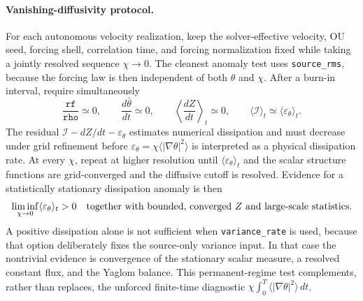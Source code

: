 \documentclass[10pt]{article}
\begin{document}
\paragraph{Vanishing-diffusivity protocol.}
For each autonomous velocity realization, keep the solver-effective velocity,
OU seed, forcing shell, correlation time, and forcing normalization fixed
while taking a jointly resolved sequence $\chi\to0$.  The cleanest anomaly
test uses \texttt{source\_rms}, because the forcing law is then independent of
both $\theta$ and $\chi$.  After a burn-in interval, require simultaneously
\begin{equation}
 \frac{\texttt{rf}}{\texttt{rho}}\simeq0,\qquad
 \frac{d\bar{\theta}}{dt}\simeq0,\qquad
 \left\langle\frac{dZ}{dt}\right\rangle_t\simeq0,\qquad
 \langle\mathcal I\rangle_t\simeq
 \langle\varepsilon_\theta\rangle_t .
\end{equation}
The residual
$\mathcal I-dZ/dt-\varepsilon_\theta$ estimates numerical dissipation and
must decrease under grid refinement before
$\varepsilon_\theta=\chi\langle|\nabla\theta|^2\rangle$ is interpreted as a
physical dissipation rate.
At every $\chi$, repeat at higher resolution until
$\langle\varepsilon_\theta\rangle_t$ and the scalar structure functions are
grid-converged and the diffusive cutoff is resolved.  Evidence for a
statistically stationary dissipation anomaly is then
\begin{equation}
 \liminf_{\chi\to0}\langle\varepsilon_\theta\rangle_t>0
 \quad\hbox{together with bounded, converged }Z
 \hbox{ and large-scale statistics}.
\end{equation}
A positive dissipation alone is not sufficient when
\texttt{variance\_rate} is used, because that option deliberately fixes the
source-only variance input.  In that case the nontrivial evidence is
convergence of the stationary scalar measure, a resolved constant flux, and
the Yaglom balance.  This permanent-regime test complements, rather than
replaces, the unforced finite-time diagnostic
$\chi\int_0^T\langle|\nabla\theta|^2\rangle\,dt$.
\end{document}

